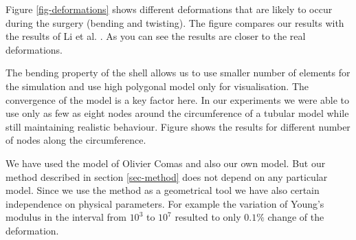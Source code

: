 Figure \ref{fig-deformations} shows different deformations that are likely to
occur during the surgery (bending and twisting). The figure compares our
results with the results of Li et al. \cite{Li2009}. As you can see the
results are closer to the real deformations.

The bending property of the shell allows us to use smaller number of
elements for the simulation and use high polygonal model only for
visualisation. The convergence of the model is a key factor here. In our experiments we
were able to use only as few as eight nodes around the circumference of a
tubular model while still maintaining realistic behaviour. Figure
 shows the results for different number of nodes along the
circumference.


We have used the model of Olivier Comas \cite{Comas2010b,Comas2010c} and
also our own model. But our method described in section \ref{sec-method}
does not depend on any particular model. Since we use the method as a
geometrical tool we have also certain independence on physical parameters.
For example the variation of Young's modulus in the interval from $10^3$ to
$10^7$ resulted to only $0.1\%$ change of the deformation.


